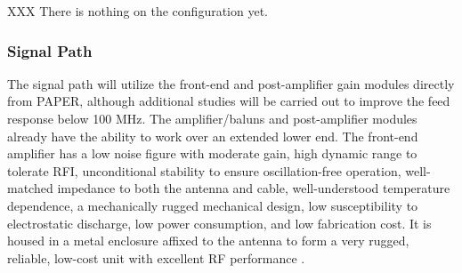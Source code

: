 \documentclass[preprint]{aastex}
\begin{document}
XXX There is nothing on the configuration yet.

\vspace{-0.25in}
\subsubsection{Signal Path}
\vspace{-6pt}
The signal path will utilize the front-end and post-amplifier gain modules directly
from PAPER, although additional studies will be carried out to improve the feed
response below 100 MHz. The amplifier/baluns and post-amplifier modules already have
the ability to work over an extended lower end. The front-end amplifier has a low
noise figure with moderate gain, high dynamic range to tolerate RFI, unconditional
stability to ensure oscillation-free operation, well-matched impedance to both the
antenna and cable, well-understood temperature dependence, a mechanically rugged
mechanical design, low susceptibility to electrostatic discharge, low power
consumption, and low fabrication cost. It is housed in a metal enclosure affixed to
the antenna to form a very rugged, reliable, low-cost unit with excellent RF
performance \citep{parsons_et_al2010}.
\end{document}
